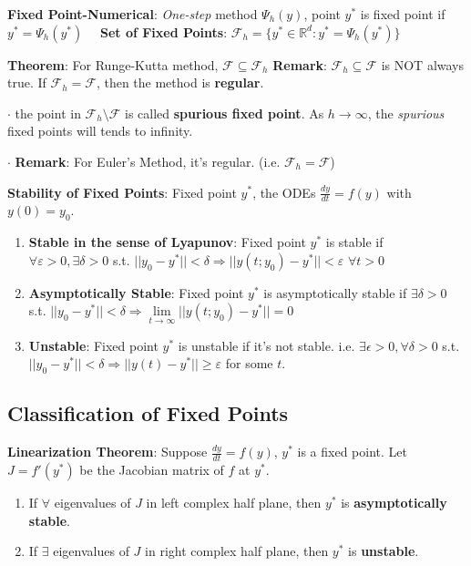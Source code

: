 \documentclass[9pt]{article}
\begin{document}
\textbf{Fixed Point-Numerical}: \textit{One-step} method $\Psi_h(y)$, point $y^*$ is fixed point if $y^*=\Psi_h(y^*)$ {\footnotesize \ \ \textbf{Set of Fixed Points}: $\mathcal{F}_h=\{y^*\in\mathbb{R}^d:y^*=\Psi_h(y^*)\}$}

\textbf{Theorem}: For Runge-Kutta method, $\mathcal{F}\subseteq\mathcal{F}_h$ \qquad \qquad \textbf{Remark}: {\small $\mathcal{F}_h\subseteq\mathcal{F}$ is NOT always true. \qquad If $\mathcal{F}_h=\mathcal{F}$, then the method is \textbf{regular}.}

$\cdot$ the point in $\mathcal{F}_h\setminus\mathcal{F}$ is called \textbf{spurious fixed point}. \qquad \qquad As $h\to\infty$, the \textit{spurious} fixed points will tends to infinity.

$\cdot$ \textbf{Remark}: For Euler's Method, it's regular. (i.e. $\mathcal{F}_h=\mathcal{F}$)

\textbf{Stability of Fixed Points}: Fixed point $y^*$, the ODEs $\frac{dy}{dt}=f(y)$ with $y(0)=y_0$.
\begin{enumerate}[itemsep=-2pt, topsep=-2pt]
    \item \textbf{Stable in the sense of Lyapunov}: Fixed point $y^*$ is stable if $\forall \varepsilon>0,\exists \delta>0$ s.t. $||y_0-y^*||<\delta\Rightarrow||y(t;y_0)-y^*||<\varepsilon$ $\forall t>0$
    \item \textbf{Asymptotically Stable}: Fixed point $y^*$ is asymptotically stable if $\exists \delta>0$ s.t. $||y_0-y^*||<\delta\Rightarrow\lim\limits_{t\to\infty}||y(t;y_0)-y^*||=0$
    \item \textbf{Unstable}: Fixed point $y^*$ is unstable if it's not stable. \quad i.e. $\exists \epsilon>0,\forall \delta>0$ s.t. $||y_0-y^*||<\delta\Rightarrow||y(t)-y^*||\geq\varepsilon$ for some $t$.
\end{enumerate}


\subsection{Classification of Fixed Points} %

\textbf{Linearization Theorem}: Suppose $\frac{dy}{dt}=f(y)$, $y^*$ is a fixed point. Let $J=f'(y^*)$ be the Jacobian matrix of $f$ at $y^*$.

\begin{enumerate}[itemsep=-2pt, topsep=-2pt]
    \item If $\forall$ eigenvalues of $J$ in left complex half plane, then $y^*$ is \textbf{asymptotically stable}.
    \item If $\exists$ eigenvalues of $J$ in right complex half plane, then $y^*$ is \textbf{unstable}.
\end{enumerate}
\end{document}
